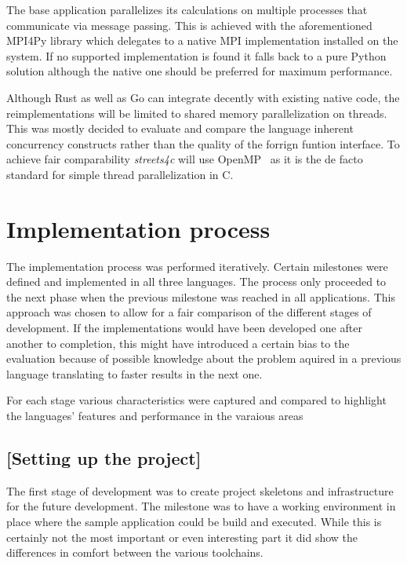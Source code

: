 The base application parallelizes its calculations on multiple processes that communicate via message passing. This is achieved with the aforementioned MPI4Py library which delegates to a native MPI implementation installed on the system. If no supported implementation is found it falls back to a pure Python solution although the native one should be preferred for maximum performance.

Although Rust as well as Go can integrate decently with existing native code, the reimplementations will be limited to shared memory parallelization on threads. This was mostly decided to evaluate and compare the language inherent concurrency constructs rather than the quality of the forrign funtion interface. To achieve fair comparability \textit{streets4c} will use OpenMP~ as it is the de facto standard for simple thread parallelization in C.

\section{Implementation process}
\label{sec:Approach::Implementation}

The implementation process was performed iteratively. Certain milestones were defined and implemented in all three languages. The process only proceeded to the next phase when the previous milestone was reached in all applications. This approach was chosen to allow for a fair comparison of the different stages of development. If the implementations would have been developed one after another to completion, this might have introduced a certain bias to the evaluation because of possible knowledge about the problem aquired in a previous language translating to faster results in the next one.

For each stage various characteristics were captured and compared to highlight the languages' features and performance in the varaious areas

\setcounter{subsection}{-1}
\subsection{[Setting up the project]}
\label{subsec:Approach::Implementation::Setup}

The first stage of development was to create project skeletons and infrastructure for the future development. The milestone was to have a working environment in place where the sample application could be build and executed. While this is certainly not the most important or even interesting part it did show the differences in comfort between the various toolchains.


